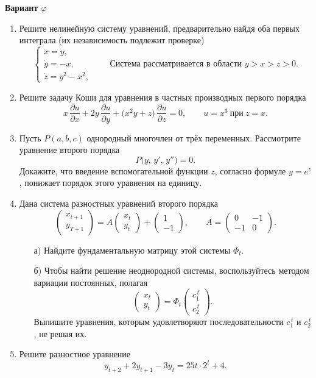 \documentclass[12pt]{article}
\begin{document}
\begin{center}
\textbf{Вариант $\varphi$}
\end{center}

\begin{enumerate}
\item Решите нелинейную систему уравнений, предварительно найдя оба первых интеграла (их независимость подлежит проверке)
\[
\begin{cases}
\dot x = y,\\[2pt]
\dot y = -x,\\[2pt]
\dot z = y^{2} - x^{2},
\end{cases}
\qquad
\text{Система рассматривается в области } y > x > z > 0.
\]

\item Решите задачу Коши для уравнения в частных производных первого порядка
\[
x\,\frac{\partial u}{\partial x}
+ 2y\,\frac{\partial u}{\partial y}
+ \bigl(x^{2}y+z\bigr)\,\frac{\partial u}{\partial z}=0,
\qquad
u = x^{3}\ \text{при}\ z = x.
\]

\item Пусть $P(a,b,c)$ однородный многочлен от трёх переменных. Рассмотрите уравнение второго порядка
\[
P\bigl(y,\,y',\,y''\bigr)=0.
\]
Докажите, что введение вспомогательной функции $z$, согласно формуле $y=e^{z}$, понижает порядок этого уравнения на единицу.

\item Дана система разностных уравнений второго порядка
\[
\begin{pmatrix}
x_{t+1}\\[2pt]
y_{T+1}
\end{pmatrix}
=
A
\begin{pmatrix}
x_{t}\\[2pt]
y_{t}
\end{pmatrix}
+
\begin{pmatrix}
1\\[2pt]
-1
\end{pmatrix},
\qquad
A=
\begin{pmatrix}
0 & -1\\
-1 & 0
\end{pmatrix}.
\]
\begin{enumerate}
\item[а)] Найдите фундаментальную матрицу этой системы $\Phi_{t}$.
\item[б)] Чтобы найти решение неоднородной системы, воспользуйтесь методом вариации постоянных, полагая
\[
\begin{pmatrix}
x_{t}\\[2pt]
y_{t}
\end{pmatrix}
=
\Phi_{t}
\begin{pmatrix}
c_{1}^{\,t}\\[2pt]
c_{2}^{\,t}
\end{pmatrix}.
\]
Выпишите уравнения, которым удовлетворяют последовательности $c_{1}^{\,t}$ и $c_{2}^{\,t}$, не решая их.
\end{enumerate}

\item Решите разностное уравнение
\[
y_{t+2}+2y_{t+1}-3y_{t}=25t \cdot 2^{t}+4.
\]
\end{enumerate}
\end{document}

